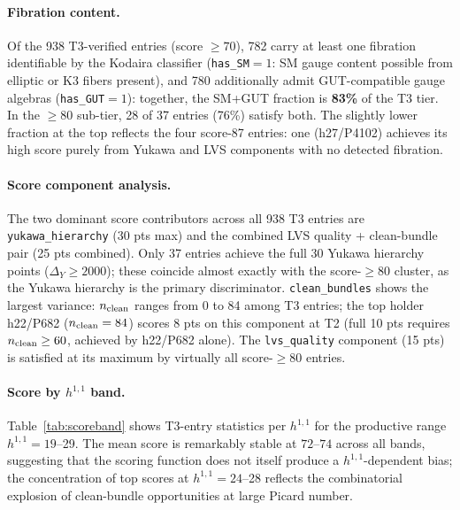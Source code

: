 \documentclass[11pt,a4paper]{article}
\begin{document}
\paragraph{Fibration content.}
Of the 938 T3-verified entries (score $\geq 70$), 782 carry at
least one fibration identifiable by the Kodaira classifier
(\texttt{has\_SM}$=1$: SM gauge content possible from elliptic or
K3 fibers present), and 780 additionally admit GUT-compatible
gauge algebras (\texttt{has\_GUT}$=1$): together, the
SM+GUT fraction is \textbf{83\%} of the T3 tier.
In the $\geq 80$ sub-tier, 28 of 37 entries (76\%) satisfy both.
The slightly lower fraction at the top reflects the four score-87
entries: one (h27/P4102) achieves its high score purely from
Yukawa and LVS components with no detected fibration.

\paragraph{Score component analysis.}
The two dominant score contributors across all 938 T3 entries are
\texttt{yukawa\_hierarchy} (30 pts max) and the combined LVS
quality + clean-bundle pair (25 pts combined).
Only 37 entries achieve the full 30 Yukawa hierarchy points
($\Delta_Y \geq 2000$); these coincide almost exactly with
the score-$\geq 80$ cluster, as the Yukawa hierarchy is the
primary discriminator.
\texttt{clean\_bundles} shows the largest variance: $n_{\rm clean}$
ranges from 0 to 84 among T3 entries; the top holder h22/P682
($n_{\rm clean}=84$) scores 8 pts on this component at T2
(full 10 pts requires $n_{\rm clean}\geq 60$, achieved by
h22/P682 alone).
The \texttt{lvs\_quality} component (15 pts) is satisfied at
its maximum by virtually all score-$\geq 80$ entries.

\paragraph{Score by $h^{1,1}$ band.}
Table~\ref{tab:scoreband} shows T3-entry statistics per $h^{1,1}$ for
the productive range $h^{1,1} = 19$--29.
The mean score is remarkably stable at $72$--$74$ across all bands,
suggesting that the scoring function does not itself produce a
$h^{1,1}$-dependent bias; the concentration of top scores at
$h^{1,1}=24$--28 reflects the combinatorial explosion of clean-bundle
opportunities at large Picard number.
\end{document}
